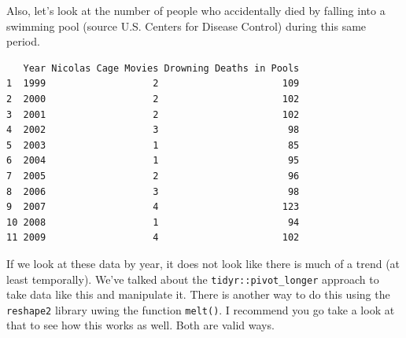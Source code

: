 \documentclass[
  letterpaper,
]{book}
\newenvironment{Shaded}{\begin{snugshade}}{\end{snugshade}}
\newcommand{\AttributeTok}[1]{\textcolor[rgb]{0.40,0.45,0.13}{#1}}
\newcommand{\DecValTok}[1]{\textcolor[rgb]{0.68,0.00,0.00}{#1}}
\newcommand{\FunctionTok}[1]{\textcolor[rgb]{0.28,0.35,0.67}{#1}}
\newcommand{\NormalTok}[1]{\textcolor[rgb]{0.00,0.23,0.31}{#1}}
\newcommand{\OtherTok}[1]{\textcolor[rgb]{0.00,0.23,0.31}{#1}}
\newcommand{\SpecialCharTok}[1]{\textcolor[rgb]{0.37,0.37,0.37}{#1}}
\newcommand{\StringTok}[1]{\textcolor[rgb]{0.13,0.47,0.30}{#1}}
\begin{document}
Also, let's look at the number of people who accidentally died by
falling into a swimming pool (source U.S. Centers for Disease Control)
during this same period.

\begin{Shaded}
\end{Shaded}

\begin{verbatim}
   Year Nicolas Cage Movies Drowning Deaths in Pools
1  1999                   2                      109
2  2000                   2                      102
3  2001                   2                      102
4  2002                   3                       98
5  2003                   1                       85
6  2004                   1                       95
7  2005                   2                       96
8  2006                   3                       98
9  2007                   4                      123
10 2008                   1                       94
11 2009                   4                      102
\end{verbatim}

If we look at these data by year, it does not look like there is much of
a trend (at least temporally). We've talked about the
\texttt{tidyr::pivot\_longer} approach to take data like this and
manipulate it. There is another way to do this using the
\texttt{reshape2} library uwing the function \texttt{melt()}. I
recommend you go take a look at that to see how this works as well. Both
are valid ways.
\end{document}
